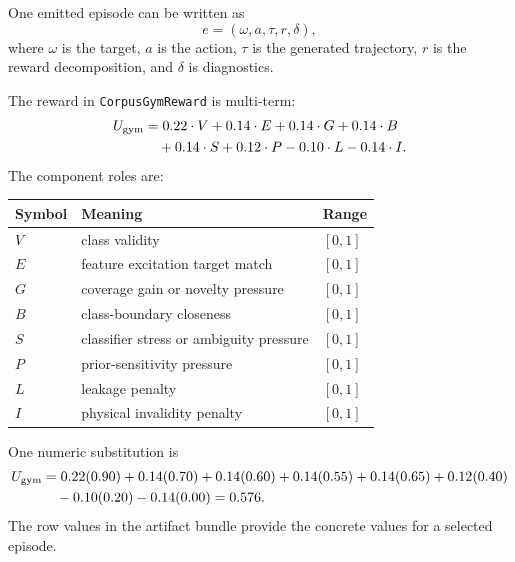 \documentclass[11pt]{article}
\begin{document}
One emitted episode can be written as
\begin{equation}
    e = (\omega, a, \tau, r, \delta),
\end{equation}
where \(\omega\) is the target, \(a\) is the action, \(\tau\) is the generated
trajectory, \(r\) is the reward decomposition, and \(\delta\) is diagnostics.

The reward in \texttt{CorpusGymReward} is multi-term:
\begin{align}
    U_{\text{gym}}
    &=
    0.22 \cdot V
    + 0.14 \cdot E
    + 0.14 \cdot G
    + 0.14 \cdot B \notag \\
    &\quad
    + 0.14 \cdot S
    + 0.12 \cdot P
    - 0.10 \cdot L
    - 0.14 \cdot I.
\end{align}
The component roles are:
\begin{center}
\small
\begin{tabularx}{\textwidth}{lXl}
\toprule
Symbol & Meaning & Range \\
\midrule
\(V\) & class validity & \([0,1]\) \\
\(E\) & feature excitation target match & \([0,1]\) \\
\(G\) & coverage gain or novelty pressure & \([0,1]\) \\
\(B\) & class-boundary closeness & \([0,1]\) \\
\(S\) & classifier stress or ambiguity pressure & \([0,1]\) \\
\(P\) & prior-sensitivity pressure & \([0,1]\) \\
\(L\) & leakage penalty & \([0,1]\) \\
\(I\) & physical invalidity penalty & \([0,1]\) \\
\bottomrule
\end{tabularx}
\end{center}

One numeric substitution is
\begin{align}
    U_{\text{gym}}
    &=
    0.22(0.90)
    + 0.14(0.70)
    + 0.14(0.60)
    + 0.14(0.55)
    + 0.14(0.65)
    + 0.12(0.40) \notag \\
    &\quad
    - 0.10(0.20)
    - 0.14(0.00)
    =
    0.576.
\end{align}
The row values in the artifact bundle provide the concrete values for a selected episode.
\end{document}
